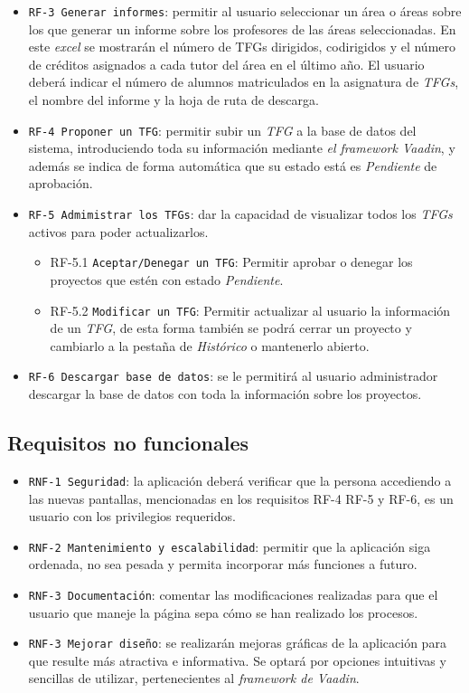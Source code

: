 \begin{itemize}
		\item \texttt{RF-3 Generar informes}: permitir al usuario seleccionar un área o áreas sobre los que generar un informe sobre los profesores de las áreas seleccionadas. En este \emph{excel} se mostrarán el número de TFGs dirigidos, codirigidos y el número de créditos asignados a cada tutor del área en el último año. El usuario deberá indicar el número de alumnos matriculados en la asignatura de \emph{TFGs}, el nombre del informe y la hoja de ruta de descarga.
		\item \texttt{RF-4 Proponer un TFG}: permitir subir un \emph{TFG} a la base de datos del sistema, introduciendo toda su información mediante \emph{el framework Vaadin}, y además se indica de forma automática que su estado está es \emph{Pendiente} de aprobación.
		\item \texttt{RF-5 Admimistrar los TFGs}: dar la capacidad de visualizar todos los \emph{TFGs} activos para poder actualizarlos.
		\begin{itemize}
			\item RF-5.1 \texttt{Aceptar/Denegar un TFG}: Permitir aprobar o denegar los proyectos que estén con estado \emph{Pendiente}. 
			\item RF-5.2 \texttt{Modificar un TFG}: Permitir actualizar al usuario la información  de un \emph{TFG}, de esta forma también se podrá cerrar un proyecto y cambiarlo a la pestaña de \emph{Histórico} o mantenerlo abierto.
		\end{itemize}
		\item \texttt{RF-6 Descargar base de datos}: se le permitirá al usuario administrador descargar la base de datos con toda la información sobre los proyectos.	
	
		
\end{itemize}

\subsection{Requisitos no funcionales}
\begin{itemize}
	\item \texttt{RNF-1 Seguridad}: la aplicación deberá verificar que la persona accediendo a las nuevas pantallas, mencionadas en los requisitos RF-4 RF-5 y RF-6, es un usuario con los privilegios requeridos.
	\item \texttt{RNF-2 Mantenimiento y escalabilidad}: permitir que la aplicación siga ordenada, no sea pesada y permita incorporar más funciones a futuro.
	\item \texttt{RNF-3 Documentación}: comentar las modificaciones realizadas para que el usuario que maneje la página sepa cómo se han realizado los procesos. 
	\item\texttt{RNF-3 Mejorar diseño}: se realizarán mejoras gráficas de la aplicación para que resulte más atractiva e informativa. Se optará por opciones intuitivas y sencillas de utilizar, pertenecientes al \emph{framework de Vaadin}.
\end{itemize}

